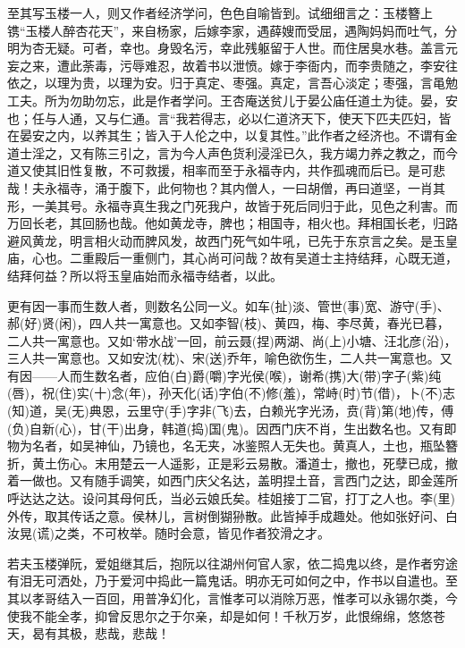 \begin{showcontents}{}
{至其写玉楼一人，则又作者经济学问，色色自喻皆到。试细细言之：玉楼簪上镌“玉楼人醉杏花天”，来自杨家，后嫁李家，遇薛嫂而受屈，遇陶妈妈而吐气，分明为杏无疑。可者，幸也。身毁名污，幸此残躯留于人世。而住居臭水巷。盖言元妄之来，遭此荼毒，污辱难忍，故着书以泄愤。嫁于李衙内，而李贵随之，李安往依之，以理为贵，以理为安。归于真定、枣强。真定，言吾心淡定；枣强，言黾勉工夫。所为勿助勿忘，此是作者学问。王杏庵送贫儿于晏公庙任道土为徒。晏，安也；任与人通，又与仁通。言“我若得志，必以仁道济天下，使天下匹夫匹妇，皆在晏安之内，以养其生；皆入于人伦之中，以复其性。”此作者之经济也。不谓有金道士淫之，又有陈三引之，言为今人声色货利浸淫已久，我方竭力养之教之，而今道又使其旧性复散，不可救援，相率而至于永福寺内，共作孤魂而后已。是可悲哉！夫永福寺，涌于腹下，此何物也？其内僧人，一曰胡僧，再曰道坚，一肖其形，一美其号。永福寺真生我之门死我户，故皆于死后同归于此，见色之利害。而万回长老，其回肠也哉。他如黄龙寺，脾也；相国寺，相火也。拜相国长老，归路避风黄龙，明言相火动而脾风发，故西门死气如牛吼，已先于东京言之矣。是玉皇庙，心也。二重殿后一重侧门，其心尚可问哉？故有吴道士主持结拜，心既无道，结拜何益？所以将玉皇庙始而永福寺结者，以此。

更有因一事而生数人者，则数名公同一义。如车(扯)淡、管世(事)宽、游守(手)、郝(好)贤(闲)，四人共一寓意也。又如李智(枝)、黄四，梅、李尽黄，春光已暮，二人共一寓意也。又如‘带水战’一回，前云聂(捏)两湖、尚(上)小塘、汪北彦(沿)，三人共一寓意也。又如安沈(枕)、宋(送)乔年，喻色欲伤生，二人共一寓意也。又有因——人而生数名者，应伯(白)爵(嚼)字光侯(喉)，谢希(携)大(带)字子(紫)纯(唇)，祝(住)实(十)念(年)，孙天化(话)字伯(不)修(羞)，常峙(时)节(借)，卜(不)志(知)道，吴(无)典恩，云里守(手)字非(飞)去，白赖光字光汤，贲(背)第(地)传，傅(负)自新(心)，甘(干)出身，韩道(捣)国(鬼)。因西门庆不肖，生出数名也。又有即物为名者，如吴神仙，乃镜也，名无夹，冰鉴照人无失也。黄真人，土也，瓶坠簪折，黄土伤心。末用楚云一人遥影，正是彩云易散。潘道士，撤也，死孽已成，撤着一做也。又有随手调笑，如西门庆父名达，盖明捏土音，言西门之达，即金莲所呼达达之达。设问其母何氏，当必云娘氏矣。桂姐接丁二官，打丁之人也。李(里)外传，取其传话之意。侯林儿，言树倒猢狲散。此皆掉手成趣处。他如张好问、白汝晃(谎)之类，不可枚举。随时会意，皆见作者狡滑之才。

若夫玉楼弹阮，爱姐继其后，抱阮以往湖州何官人家，依二捣鬼以终，是作者穷途有泪无可洒处，乃于爱河中捣此一篇鬼话。明亦无可如何之中，作书以自遣也。至其以孝哥结入一百回，用普净幻化，言惟孝可以消除万恶，惟孝可以永锡尔类，今使我不能全孝，抑曾反思尔之于尔亲，却是如何！千秋万岁，此恨绵绵，悠悠苍天，曷有其极，悲哉，悲哉！


}
\end{showcontents}
